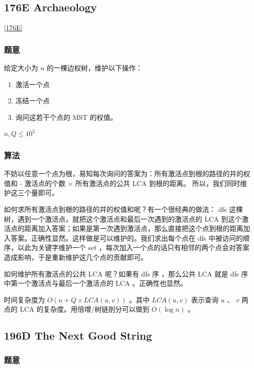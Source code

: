 \documentclass[11pt]{article}
\begin{document}
\subsection{176E  Archaeology}
\label{sec-11-1}

   \ref{176E}
\subsubsection{题意}
\label{sec-11-1-1}

    给定大小为 $n$ 的一棵边权树，维护以下操作：
\begin{enumerate}
\item 激活一个点
\item 冻结一个点
\item 询问这若干个点的 MST 的权值。
\end{enumerate}

    $n, Q \leq 10^5$ 
\subsubsection{算法}
\label{sec-11-1-2}

    不妨以任意一个点为根，易知每次询问的答案为：所有激活点到根的路径的并的权值和 - 激活点的个数 $\times$ 所有激活点的公共 LCA 到根的距离。
    所以，我们同时维护这三个量即可。

    如何求所有激活点到根的路径的并的权值和呢？有一个很经典的做法： dfs 这棵树，遇到一个激活点，就把这个激活点和最后一次遇到的激活点的 LCA 到这个激活点的距离加入答案；如果是第一次遇到激活点，那么直接把这个点到根的距离加入答案。正确性显然。这样做是可以维护的。我们求出每个点在 dfs 中被访问的顺序，以此为关键字维护一个 set ，每次加入一个点的话只有相邻的两个点会对答案造成影响，于是重新维护这几个点的贡献即可。

    如何维护所有激活点的公共 LCA 呢？如果有 dfs 序 ，那么公共 LCA 就是 dfs 序中第一个激活点与最后一个激活点的 LCA 。正确性也显然。

    时间复杂度为 $O(n + Q \times LCA (u, v))$ 。其中 $LCA (u, v)$ 表示查询 $u$ 、 $v$ 两点的 LCA 的复杂度。用倍增/树链剖分可以做到 $O(\log n)$ 。
\subsection{196D  The Next Good String}
\label{sec-11-2}
\subsubsection{题意}
\label{sec-11-2-1}
\end{document}
